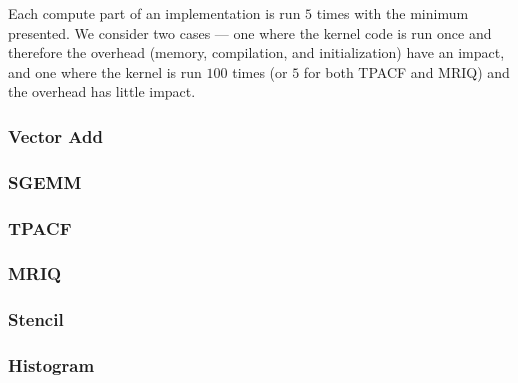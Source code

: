 Each compute part of an implementation is run $5$ times with the minimum
  presented.
We consider two cases --- one where the kernel code is run once and therefore
  the overhead (memory, compilation, and initialization) have an impact,
  and one where the kernel is run $100$ times (or $5$ for both TPACF and MRIQ)
  and the overhead has little impact.



\subsubsection{Vector Add}

\subsubsection{SGEMM}

\subsubsection{TPACF}

\subsubsection{MRIQ}

\subsubsection{Stencil}

\subsubsection{Histogram}

